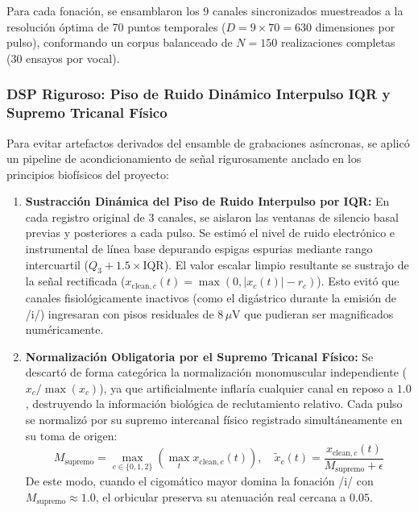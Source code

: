 \documentclass[11pt,a4paper]{article}
\begin{document}
Para cada fonación, se ensamblaron los 9 canales sincronizados muestreados a la resolución óptima de 70 puntos temporales ($D = 9 \times 70 = 630$ dimensiones por pulso), conformando un corpus balanceado de $N = 150$ realizaciones completas (30 ensayos por vocal).

\subsubsection{DSP Riguroso: Piso de Ruido Dinámico Interpulso IQR y Supremo Tricanal Físico}
\label{subsubsec:dsp_riguroso_pseudo_hd}

Para evitar artefactos derivados del ensamble de grabaciones asíncronas, se aplicó un pipeline de acondicionamiento de señal rigurosamente anclado en los principios biofísicos del proyecto:
\begin{enumerate}
    \item \textbf{Sustracción Dinámica del Piso de Ruido Interpulso por IQR:} En cada registro original de 3 canales, se aislaron las ventanas de silencio basal previas y posteriores a cada pulso. Se estimó el nivel de ruido electrónico e instrumental de línea base depurando espigas espurias mediante rango intercuartil ($Q_3 + 1.5 \times \text{IQR}$). El valor escalar limpio resultante se sustrajo de la señal rectificada ($x_{\text{clean}, c}(t) = \max(0, |x_c(t)| - r_c)$). Esto evitó que canales fisiológicamente inactivos (como el digástrico durante la emisión de /i/) ingresaran con pisos residuales de $8\,\mu\text{V}$ que pudieran ser magnificados numéricamente.
    \item \textbf{Normalización Obligatoria por el Supremo Tricanal Físico:} Se descartó de forma categórica la normalización monomuscular independiente ($x_c / \max(x_c)$), ya que artificialmente inflaría cualquier canal en reposo a $1.0$, destruyendo la información biológica de reclutamiento relativo. Cada pulso se normalizó por su supremo intercanal físico registrado simultáneamente en su toma de origen:
    \begin{equation}
        M_{\text{supremo}} = \max_{c \in \{0, 1, 2\}} \left( \max_t x_{\text{clean}, c}(t) \right), \quad \tilde{x}_c(t) = \frac{x_{\text{clean}, c}(t)}{M_{\text{supremo}} + \epsilon}
    \end{equation}
    De este modo, cuando el cigomático mayor domina la fonación /i/ con $M_{\text{supremo}} \approx 1.0$, el orbicular preserva su atenuación real cercana a $0.05$.
\end{enumerate}
\end{document}
